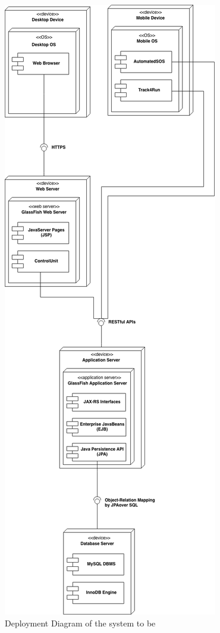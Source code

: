 \begin{figure}[H]
  \begin{center}
  	\includegraphics[height=0.68\paperheight]{./img/Deployment_Diagram.png}
    \hspace{0.05\linewidth}
    \centering
    \caption{Deployment Diagram of the system to be}
		\label{img:Deployment_Diagram}
    \end{center}
\end{figure}

